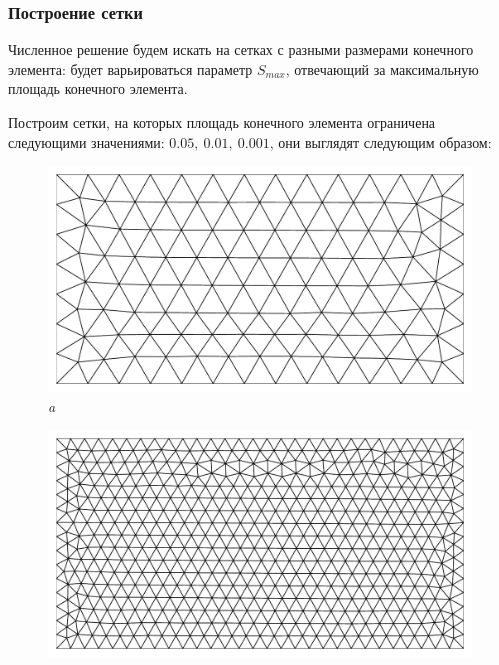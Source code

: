 \documentclass[12pt, a4paper]{article}
\begin{document}
				
				\newpage
				\subsubsection{Построение сетки}
					Численное решение будем искать на сетках с разными размерами конечного элемента: будет варьироваться параметр $S_{max}$, отвечающий за максимальную площадь конечного элемента. 
					 				
					Построим сетки, на которых площадь конечного элемента ограничена следующими значениями: $0.05, \ 0.01, \ 0.001$, они выглядят следующим образом: 
					
										
					\begin{figure}[h]       
						\vspace{5.0mm} 
						\begin{center} 
							{ 
								\begin{minipage}{0.45\textwidth} 
									\centering 
									\includegraphics[width=1\columnwidth]{rect_dirichlet_only_005_calfem_net.pdf}\\ 
									\textit{a} 
								\end{minipage}                                 
							} 
							{ 
								\begin{minipage}{0.45\textwidth} 
									\centering 
									\includegraphics[width=1\columnwidth]{rect_dirichlet_only_001_calfem_net.pdf}\\ 

\end{minipage}}
\end{center}
\end{figure}
\end{document}
